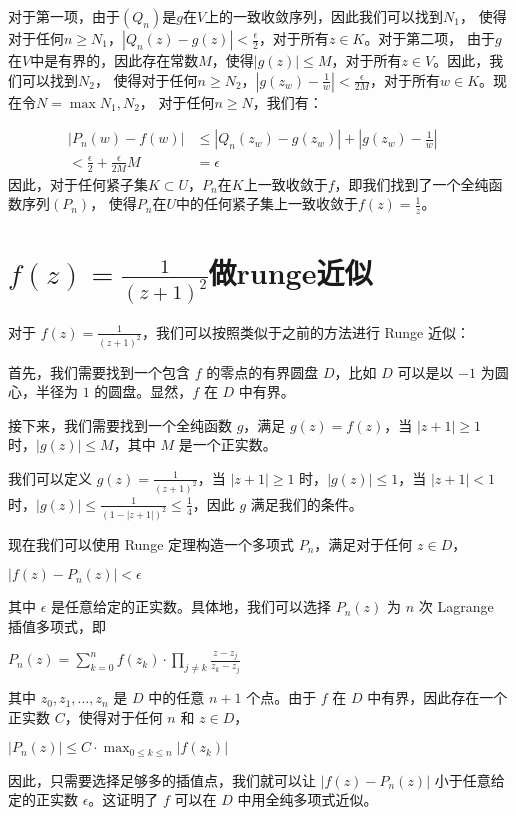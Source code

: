 \documentclass[12pt, a4paper, oneside]{article}
\begin{document}
\begin{spacing}{2.0}
对于第一项，由于$(Q_n)$是$g$在$V$上的一致收敛序列，因此我们可以找到$N_1$，
使得对于任何$n \geq N_1$，$|Q_n(z) - g(z)| < \frac{\epsilon}{2}$，对于所有$z \in K$。对于第二项，
由于$g$在$V$中是有界的，因此存在常数$M$，使得$|g(z)| \leq M$，对于所有$z \in V$。因此，我们可以找到$N_2$，
使得对于任何$n \geq N_2$，$|g(z_w) - \frac{1}{w}| < \frac{\epsilon}{2M}$，对于所有$w \in K$。现在令$N = \max{N_1, N_2}$，
对于任何$n \geq N$，我们有：

\begin{equation}
    \begin{aligned}
        |P_n(w) - f(w)| &\leq |Q_n(z_w) - g(z_w)| + |g(z_w) - \frac{1}{w}|\
        &\\< \frac{\epsilon}{2} + \frac{\epsilon}{2M} M\
        &= \epsilon
    \end{aligned}
    \label{f2}
\end{equation}
因此，对于任何紧子集$K \subset U$，$P_n$在$K$上一致收敛于$f$，即我们找到了一个全纯函数序列$(P_n)$，
使得$P_n$在$U$中的任何紧子集上一致收敛于$f(z) = \frac{1}{z}$。


\section{$f(z) = \frac{1}{(z+1)^2}$做runge近似}
对于 $f(z) = \frac{1}{(z+1)^2}$，我们可以按照类似于之前的方法进行 Runge 近似：

首先，我们需要找到一个包含 $f$ 的零点的有界圆盘 $D$，比如 $D$ 可以是以 $-1$ 为圆心，半径为 $1$ 的圆盘。显然，$f$ 在 $D$ 中有界。

接下来，我们需要找到一个全纯函数 $g$，满足 $g(z) = f(z)$，当 $|z+1| \geq 1$ 时，$|g(z)| \leq M$，其中 $M$ 是一个正实数。

我们可以定义 $g(z) = \frac{1}{(z+1)^2}$，当 $|z+1| \geq 1$ 时，$|g(z)| \leq 1$，当 $|z+1| < 1$ 时，$|g(z)| \leq \frac{1}{(1-|z+1|)^2} \leq \frac{1}{4}$，因此 $g$ 满足我们的条件。

现在我们可以使用 Runge 定理构造一个多项式 $P_n$，满足对于任何 $z \in D$，

\begin{center}
    $|f(z) - P_n(z)|<\epsilon$
\end{center}

其中 $\epsilon$ 是任意给定的正实数。具体地，我们可以选择 $P_n(z)$ 为 $n$ 次 Lagrange 插值多项式，即
\begin{center}
    $P_n(z) = \sum_{k = 0}^{n}f(z_k) \cdot {\textstyle \prod_{j\neq k}}\frac{z - z_j}{z_k - z_j} $
\end{center}
其中 $z_0, z_1, \ldots, z_n$ 是 $D$ 中的任意 $n+1$ 个点。由于 $f$ 在 $D$ 中有界，因此存在一个正实数 $C$，使得对于任何 $n$ 和 $z \in D$，
\begin{center}
    $|P_n(z)|\leq C\cdot \max_{0\leq k\leq n}|f(z_k)| $
\end{center}
因此，只需要选择足够多的插值点，我们就可以让 $|f(z) - P_n(z)|$ 小于任意给定的正实数 $\epsilon$。这证明了 $f$ 可以在 $D$ 中用全纯多项式近似。


\end{spacing}
\end{document}
